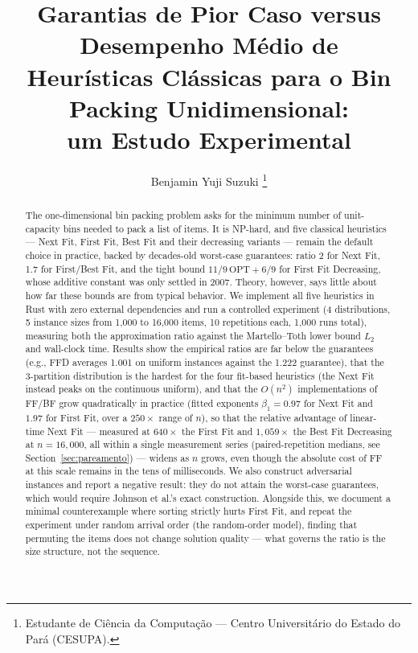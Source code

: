 \documentclass[12pt]{article}
\title{Garantias de Pior Caso versus Desempenho Médio de\\ Heurísticas Clássicas para o Bin Packing Unidimensional:\\ um Estudo Experimental}
\author{
  Benjamin Yuji Suzuki
    \thanks{Estudante de Ciência da Computação — Centro Universitário do Estado do Pará (CESUPA).} \inst{1}
}
\begin{document}
\maketitle

\begin{abstract}
The one-dimensional bin packing problem asks for the minimum number of unit-capacity bins needed to pack a list of items. It is NP-hard, and five classical heuristics --- Next Fit, First Fit, Best Fit and their decreasing variants --- remain the default choice in practice, backed by decades-old worst-case guarantees: ratio 2 for Next Fit, 1.7 for First/Best Fit, and the tight bound $11/9\,\mathrm{OPT}+6/9$ for First Fit Decreasing, whose additive constant was only settled in 2007. Theory, however, says little about how far these bounds are from typical behavior. We implement all five heuristics in Rust with zero external dependencies and run a controlled experiment (4 distributions, 5 instance sizes from 1{,}000 to 16{,}000 items, 10 repetitions each, 1{,}000 runs total), measuring both the approximation ratio against the Martello--Toth lower bound $L_2$ and wall-clock time. Results show the empirical ratios are far below the guarantees (e.g., FFD averages 1.001 on uniform instances against the 1.222 guarantee), that the 3-partition distribution is the hardest for the four fit-based heuristics (the Next Fit instead peaks on the continuous uniform), and that the $O(n^2)$ implementations of FF/BF grow quadratically in practice (fitted exponents $\beta_1 = 0.97$ for Next Fit and $1.97$ for First Fit, over a $250\times$ range of $n$), so that the relative advantage of linear-time Next Fit --- measured at $640\times$ the First Fit and $1{,}059\times$ the Best Fit Decreasing at $n = 16{,}000$, all within a single measurement series (paired-repetition medians, see Section~\ref{sec:pareamento}) --- widens as $n$ grows, even though the absolute cost of FF at this scale remains in the tens of milliseconds. We also construct adversarial instances and report a negative result: they do not attain the worst-case guarantees, which would require Johnson et al.'s exact construction. Alongside this, we document a minimal counterexample where sorting strictly hurts First Fit, and repeat the experiment under random arrival order (the random-order model), finding that permuting the items does not change solution quality --- what governs the ratio is the size structure, not the sequence.
\end{abstract}
\end{document}
